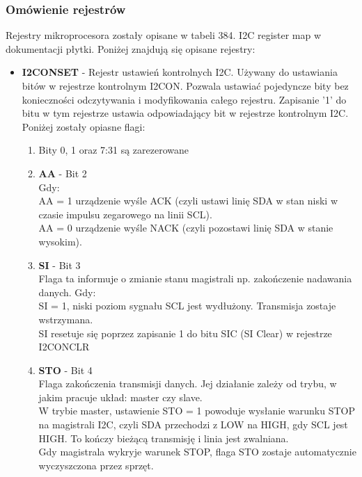 \subsubsection{Omówienie rejestrów}
Rejestry mikroprocesora zostały opisane w tabeli 384. I2C register map w dokumentacji płytki. Poniżej znajdują się opisane rejestry:
\begin{itemize}
    \item \textbf{I2CONSET} - Rejestr ustawień kontrolnych I2C. Używany do ustawiania bitów w rejestrze kontrolnym I2CON. Pozwala ustawiać pojedyncze bity bez konieczności odczytywania i modyfikowania całego rejestru. Zapisanie '1' do bitu w tym rejestrze ustawia odpowiadający bit w rejestrze kontrolnym I2C. Poniżej zostały opiasne flagi:
    \begin{enumerate}
        \item Bity 0, 1 oraz 7:31 są zarezerowane 
        \item \textbf{AA} - Bit 2 \\
            Gdy:\\
            AA = 1 urządzenie wyśle ACK (czyli ustawi linię SDA w stan niski w czasie impulsu zegarowego na linii SCL). \\
            AA = 0 urządzenie wyśle NACK (czyli pozostawi linię SDA w stanie wysokim).
        \item \textbf{SI} - Bit 3 \\
            Flaga ta informuje o zmianie stanu magistrali np. zakończenie nadawania danych.
            Gdy:\\
            SI = 1, niski poziom sygnału SCL jest wydłużony. Transmisja zostaje wstrzymana.\\
            SI resetuje się poprzez zapisanie 1 do bitu SIC (SI Clear) w rejestrze I2CONCLR
        \item \textbf{STO} - Bit 4\\
            Flaga zakończenia transmisji danych. Jej działanie zależy od trybu, w jakim pracuje układ: master czy slave.\\
            W trybie master, ustawienie STO = 1 powoduje wysłanie warunku STOP na magistrali I2C, czyli SDA przechodzi z LOW na HIGH, gdy SCL jest HIGH. To kończy bieżącą transmisję i linia jest zwalniana.\\
            Gdy magistrala wykryje warunek STOP, flaga STO zostaje automatycznie wyczyszczona przez sprzęt.


\end{enumerate}
\end{itemize}
